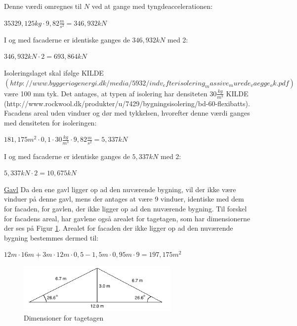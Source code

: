 Denne værdi omregnes til $N$ ved at gange med tyngdeaccelerationen:
\begin{center}
	$35329,\!125 kg\cdot 9,\!82 \frac{m}{s^2}=346,\!932 kN$
\end{center}

I og med facaderne er identiske ganges de $346,\!932 kN$ med 2:
\begin{center}
	$346,\!932 kN\cdot 2=693,\!864 kN$
\end{center}

Isoleringslaget skal ifølge KILDE$(http://www.byggeriogenergi.dk/media/5932/indv_efterisolering_massive_murede_vaegge_ok.pdf)$ være 100 mm tyk. Det antages, at typen af isolering har densiteten $30 \frac{kg}{m^3}$ KILDE (http://www.rockwool.dk/produkter/u/7429/bygningsisolering/bd-60-flexibatts).
\newline \indent{     }  Facadens areal uden vinduer og dør med tykkelsen, hvorefter denne værdi ganges med densiteten for isoleringen:
\begin{center}
	$181,\!175 m^2\cdot 0,1 \cdot 30 \frac{kg}{m^3}\cdot 9,\!82 \frac{m}{s^2}=5,\!337 kN$
\end{center}

I og med facaderne er identiske ganges de $5,\!337 kN$ med 2:
\begin{center}
	$5,\!337 kN\cdot 2=10,\!675 kN$
\end{center}

\underline{Gavl}
\newline
Da den ene gavl ligger op ad den nuværende bygning, vil der ikke være vinduer på denne gavl, mens der antages at være 9 vinduer, identiske med dem for facaden, for gavlen, der ikke ligger op ad den nuværende bygning. Til forskel for facadens areal, har gavlene også arealet for tagetagen, som har dimensionerne der ses på Figur \ref{fig:tagetage}. Arealet for facaden der ikke ligger op ad den nuværende bygning bestemmes dermed til:
\begin{center}
	$12 m\cdot 16 m + 3 m\cdot 12 m \cdot 0,\!5 - 1,\!5 m\cdot 0,\!95 m \cdot 9=197,\!175 m^2$
\end{center}

\begin{figure}[htbp]
	\centering
	\includegraphics[width=0.7\textwidth]{billeder/Tagmedvinkel.png}
	\caption{Dimensioner for tagetagen}
	\label{fig:tagetage}
\end{figure}

